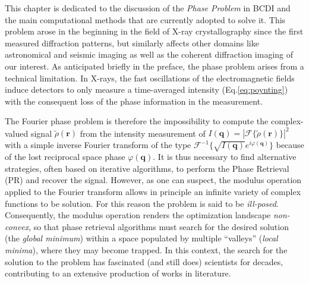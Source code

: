 
This chapter is dedicated to the discussion of the \textit{Phase Problem} in BCDI and the main computational methods 
that are currently adopted to solve it. This problem arose in the beginning in the field of X-ray crystallography since 
the first measured diffraction patterns, but similarly affects other domains like astronomical and seismic imaging as 
well as the coherent diffraction imaging of our interest. As anticipated briefly in the preface, the phase 
problem arises from a technical limitation. In X-rays, the fast oscillations of the electromagnetic fields induce detectors 
to only measure a time-averaged intensity (Eq.\ref{eq:poynting}) with the consequent loss of the phase information 
in the measurement.

The Fourier phase problem is therefore the impossibility to compute the complex-valued signal $\tilde{\rho}(\mathbf{r})$ 
from the intensity measurement of $I(\mathbf{q}) = |\mathcal{F}\{\tilde{\rho}(\mathbf{r})\}|^2 $ with a simple 
inverse Fourier transform of the type $\mathcal{F}^{-1}\{\sqrt{I(\mathbf{q})}e^{i\varphi(\mathbf{q})}\}$ because of the lost 
reciprocal space phase $ \varphi(\mathbf{q}) $. It is thus necessary to find alternative strategies, often based on 
iterative algorithms, to perform the Phase Retrieval (PR) and recover the signal.
However, as one can suspect, the modulus operation applied to the Fourier transform
allows in principle an infinite variety of complex functions to be solution. For this reason the problem is said to be 
\textit{ill-posed}. Consequently, the modulus operation renders the optimization landscape \textit{non-convex}, so that phase 
retrieval algorithms must search for the desired solution (the \textit{global minimum}) within a space populated by 
multiple ``valleys'' (\textit{local minima}), where they may become trapped.
In this context, the search for the solution 
to the problem has fascinated (and still does) scientists for decades, contributing to an extensive production of works in 
literature.

